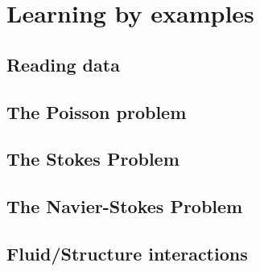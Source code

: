 %
%
%
%
%


\chapter{Learning by examples}
\label{cha:examples}


\section{Reading data}
\label{sec:readingData}


\section{The Poisson problem}
\label{sec:poisson}



\section{The Stokes Problem}
\label{sec:stokesproblem}



\section{The Navier-Stokes Problem}
\label{sec:navierstokesproblem}



\section{Fluid/Structure interactions}
\label{sec:gettingstarted}





%
%
